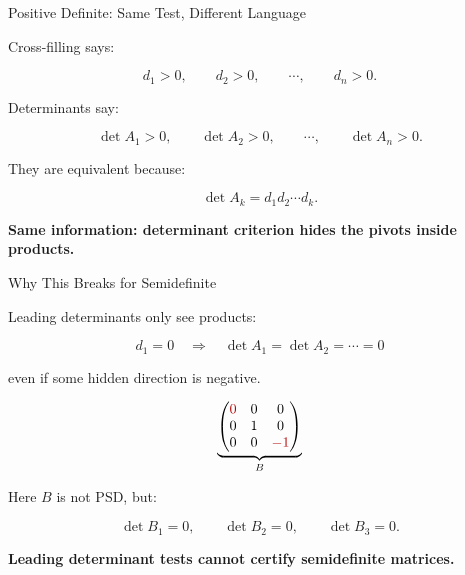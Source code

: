 \documentclass[10pt]{beamer}
\theoremstyle{definition}
\newcommand{\x}[1]{\alert{\textbf{#1}}}
\newcommand{\rd}[1]{{\color{red!70!black}#1}}
\begin{document}
\begin{frame}{Positive Definite: Same Test, Different Language}

Cross-filling says:

$$
d_1>0,\qquad d_2>0,\qquad \cdots,\qquad d_n>0.
$$

\vfill

Determinants say:

$$
\det A_1>0,\qquad \det A_2>0,\qquad \cdots,\qquad \det A_n>0.
$$

\vfill

They are equivalent because:

$$
\det A_k=d_1d_2\cdots d_k.
$$

\vfill

\begin{center}
\x{Same information: determinant criterion hides the pivots inside products.}
\end{center}

\end{frame}


\begin{frame}[shrink=5]{Why This Breaks for Semidefinite}

Leading determinants only see products:

$$
d_1=0
\quad\Longrightarrow\quad
\det A_1=\det A_2=\cdots=0
$$

even if some hidden direction is negative.

\vfill

\[
\underbrace{
\begin{pmatrix}
\rd{0}&0&0\\
0&1&0\\
0&0&\rd{-1}
\end{pmatrix}}_{B}
\]

\vspace{0.1cm}

Here $B$ is not PSD, but:

$$
\det B_1=0,\qquad \det B_2=0,\qquad \det B_3=0.
$$

\begin{center}
\x{Leading determinant tests cannot certify semidefinite matrices.}
\end{center}

\end{frame}
\end{document}

